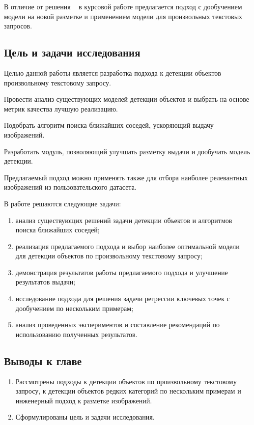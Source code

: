 \documentclass[a4paper,14pt]{article}
\begin{document}
    В отличие от решения ~\cite{AnnoMage} в курсовой работе предлагается подход с дообучением модели на новой разметке и применением модели для произвольных текстовых запросов.

    \subsection{Цель и задачи исследования}

    Целью данной работы является разработка подхода к детекции объектов произвольному текстовому запросу.

    Провести анализ существующих моделей детекции объектов и выбрать на основе метрик качества лучшую реализацию.

    Подобрать алгоритм поиска ближайших соседей, ускоряющий выдачу изображений.

    Разработать модуль, позволяющий улучшать разметку выдачи и дообучать модель детекции.

    Предлагаемый подход можно применять также для отбора наиболее релевантных изображений из пользовательского датасета.

    В работе решаются следующие задачи:
    \begin{enumerate}
        [1)]
        \itemsep0em
        \item анализ существующих решений задачи детекции объектов и алгоритмов поиска ближайших соседей;
        \item реализация предлагаемого подхода и выбор наиболее оптимальной модели для детекции объектов по произвольному текстовому запросу;
        \item демонстрация результатов работы предлагаемого подхода и улучшение результатов выдачи;
        \item исследование подхода для решения задачи регрессии ключевых точек с дообучением по нескольким примерам;
        \item анализ проведенных экспериментов и составление рекомендаций по использованию полученных результатов.
    \end{enumerate}

    \subsection{Выводы к главе \thesection}
    \begin{enumerate}
        \itemsep0em
        \item Рассмотрены подходы к детекции объектов по произвольному текстовому запросу, к детекции объектов редких категорий по нескольким примерам и инженерный подход к разметке изображений.
        \item Сформулированы цель и задачи исследования.
    \end{enumerate}
\end{document}
